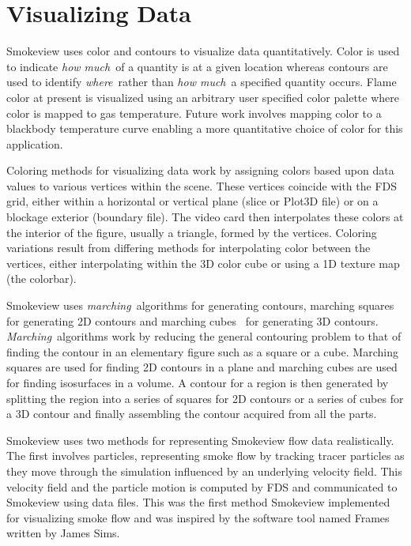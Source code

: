 \documentclass[11pt,twoside]{book}
\begin{document}
%
%

\chapter{Visualizing Data}
Smokeview uses color and contours to visualize data
quantitatively. Color is used to indicate {\em how much}\ of a
quantity is at a given location whereas contours are used to
identify {\em where}\ rather than {\em how much}\ a specified
quantity occurs. Flame color at present is visualized using an
arbitrary user specified color palette where color is mapped to
gas temperature.  Future work involves mapping color to a
blackbody temperature curve enabling a more quantitative choice of
color for this application.

Coloring methods for visualizing data work by assigning colors
based upon data values to various vertices within the scene. These
vertices coincide with the FDS grid, either within a horizontal or
vertical plane (slice or Plot3D file) or on a blockage exterior
(boundary file).  The video card then interpolates these colors at
the interior of the figure, usually a triangle, formed by the
vertices. Coloring variations result from differing methods for
interpolating color between the vertices, either interpolating
within the 3D color cube or using a 1D texture map (the colorbar).

Smokeview uses {\em marching}\ algorithms for generating contours,
marching squares for generating 2D contours and marching
cubes~\cite{marchingcubes} for generating 3D contours. {\em
Marching}\ algorithms work by reducing the general contouring
problem to that of finding the contour in an elementary figure
such as a square or a cube.  Marching squares are used for finding
2D contours in a plane and marching cubes are used for finding
isosurfaces in a volume. A contour for a region is then generated
by splitting the region into a series of squares for 2D contours
or a series of cubes for a 3D contour and finally assembling the
contour acquired from all the parts.

Smokeview uses two methods for representing Smokeview flow data
realistically.  The first involves particles, representing smoke
flow by tracking tracer particles as they move through the
simulation influenced by an underlying  velocity field.  This
velocity field and the particle motion is computed by FDS and
communicated to Smokeview using data files.  This was the first
method Smokeview implemented for visualizing smoke flow and was
inspired by the software tool named Frames written by James Sims.
\end{document}
